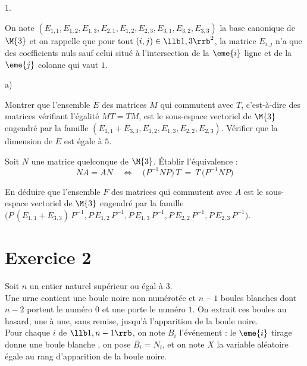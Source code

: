 \documentclass[11pt]{article}%
\begin{document}
\begin{noliste}{1.}
\item On note $(E_{1, 1}, E_{1, 2}, E_{1, 3}, E_{2, 1}, E_{1, 2},
  E_{2, 3}, E_{3, 1}, E_{3, 2}, E_{3, 3})$ la base canonique de
  $\M{3}$ et on rappelle que pour tout $(i, j) \in \llb 1, 3 \rrb^2$,
  la matrice $E_{i, j}$ n'a que des coefficients nuls sauf celui situé
  à l'intersection de la $\eme{i}$ ligne et de la $\eme{j}$ colonne
  qui vaut $1$.
  \begin{noliste}{a)}
    \setlength{\itemsep}{2mm}
  \item Montrer que l'ensemble $E$ des matrices $M$ qui commutent avec
    $T$, c'est-à-dire des matrices vérifiant l'égalité $MT = TM$, est
    le sous-espace vectoriel de $\M{3}$ engendré par la famille
    $(E_{1, 1} + E_{3, 3}, E_{1, 2}, E_{1,3}, E_{2, 2}, E_{2,
      3})$. Vérifier que la dimension de $E$ est égale à $5$.

  \item Soit $N$ une matrice quelconque de $\M{3}$. Établir
    l'équivalence :
    \[
    NA = AN \quad \Leftrightarrow \quad \big( P^{-1} N P \big) \, T \
    = \ T \, \big( P^{-1} N P \big)
    \]

  \item En déduire que l'ensemble $F$ des matrices qui commutent avec
    $A$ est le sous-espace vectoriel de $\M{3}$ engendré par la
    famille $\big( P \, (E_{1,1} + E_{3,3}) \, P^{-1}, P \, E_{1,2} \,
    P^{-1}, P \, E_{1,3} \, P^{-1}, P \, E_{2,2} \, P^{-1}, P \,
    E_{2, 3} \, P^{-1} \big)$.
  \end{noliste}
\end{noliste}


\newpage


\section*{Exercice 2}

\noindent 
Soit $n$ un entier naturel supérieur ou égal à $3$.\\
Une urne contient une boule noire non numérotée et $n-1$ boules
blanches dont $n-2$ portent le numéro $0$ et une porte le numéro
$1$. On extrait ces boules au hasard, une à une, sans remise, jusqu'à
l'apparition de la boule noire.\\
Pour chaque $i$ de $\llb 1, n-1 \rrb$, on note $B_i$ l'événement : \og
le $\eme{i}$ tirage donne une boule blanche \fg{}, on pose
$\overline{B_i} = N_i$, et on note $X$ la variable aléatoire égale au
rang d'apparition de la boule noire.
\end{document}
